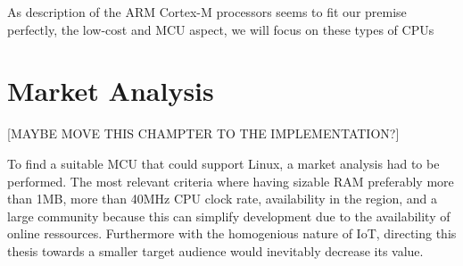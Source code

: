 As description of the ARM Cortex-M processors seems to fit our premise perfectly, the low-cost and MCU aspect, we will focus on these types of CPUs


\section{Market Analysis}

[MAYBE MOVE THIS CHAMPTER TO THE IMPLEMENTATION?]

To find a suitable MCU that could support Linux, a market analysis had to be performed. The most relevant criteria where having sizable RAM preferably more than 1MB, more than 40MHz CPU clock rate, availability in the region, and a large community because this can simplify development due to the availability of online ressources. Furthermore with the homogenious nature of IoT, directing this thesis towards a smaller target audience would inevitably decrease its value.


